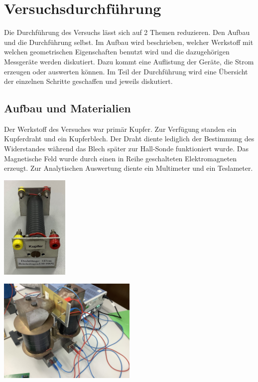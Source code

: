 \section{Versuchsdurchführung} 
\label{sec:versuchdurchführung}
Die Durchführung des Versuchs lässt sich auf 2 Themen reduzieren. Den Aufbau %
und die Durchführung %
selbst. Im Aufbau wird beschrieben, 
welcher Werkstoff mit welchen geometrischen Eigenschaften benutzt wird und die dazugehörigen Messgeräte werden diskutiert. Dazu kommt eine Auflistung der Geräte, die Strom erzeugen oder 
auswerten können. Im Teil der Durchführung %
wird eine Übersicht der einzelnen Schritte geschaffen und jeweils diskutiert.


\subsection{Aufbau und Materialien}
\label{sec:Aufbau}
Der Werkstoff des Versuches war primär Kupfer. Zur Verfügung standen ein Kupferdraht und ein Kupferblech. Der Draht diente lediglich der Bestimmung des Widerstandes während 
das Blech später zur Hall-Sonde funktioniert wurde. 
Das Magnetische Feld wurde durch einen in Reihe geschalteten Elektromagneten erzeugt. Zur Analytischen Auswertung diente ein Multimeter und ein Teslameter.\\
 
\vspace{1cm}
\begin{minipage}{0.5\textwidth}
\centering
\includegraphics[height=5cm]{bilder/Kupferdraht.png}
\label{fig:Kupferdraht}
\end{minipage}
\hfill
\begin{minipage}{0.49\textwidth} 
\centering
\includegraphics[height=5cm]{bilder/Magnet.png}
\label{fig:Magnet}
\end{minipage}

